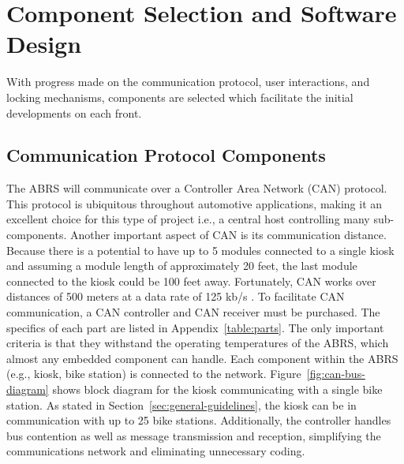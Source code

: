 \documentclass[11pt,a4paper,onesides]{report}
\begin{document}
\chapter{Component Selection and Software Design}

With progress made on the communication protocol, user interactions, and locking mechanisms, components are selected which facilitate the initial developments on each front.

\section{Communication Protocol Components}

The ABRS will communicate over a Controller Area Network (CAN) protocol.  This protocol is ubiquitous throughout automotive applications, making it an excellent choice for this type of project i.e., a central host controlling many sub-components.  Another important aspect of CAN is its communication distance.  Because there is a potential to have up to 5 modules connected to a single kiosk and assuming a module length of approximately 20 feet, the last module connected to the kiosk could be 100 feet away.  Fortunately, CAN works over distances of 500 meters at a data rate of 125 kb/s \cite{CAN protocol}.  To facilitate CAN communication, a CAN controller and CAN receiver must be purchased.  The specifics of each part are listed in Appendix~\ref{table:parts}.  The only important criteria is that they withstand the operating temperatures of the ABRS, which almost any embedded component can handle.  Each component within the ABRS (e.g., kiosk, bike station) is connected to the network.  Figure~\ref{fig:can-bus-diagram} shows block diagram for the kiosk communicating with a single bike station.  As stated in Section~\ref{sec:general-guidelines}, the kiosk can be in communication with up to 25 bike stations.  Additionally, the controller handles bus contention as well as message transmission and reception, simplifying the communications network and eliminating unnecessary coding.   
\end{document}

